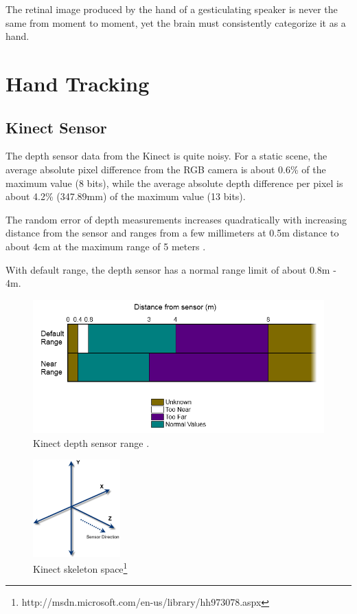\begin{savequote}
The retinal image produced by the hand of a gesticulating
speaker is never the same from moment to moment, yet the brain must consistently categorize
it as a hand. 
\end{savequote}
\chapter{Hand Tracking}

\section{Kinect Sensor}
The depth sensor data from the Kinect is quite noisy. For a static scene, the
average absolute pixel difference from the RGB camera is about 0.6\% of the maximum value (8
bits), while the average absolute depth difference per pixel is about 4.2\%
(347.89mm) of the maximum value (13 bits).

The random error of depth measurements increases quadratically with increasing distance from the 
sensor and ranges from a few millimeters at 0.5m distance to about 4cm
at the maximum range of 5 meters \cite{khoshelham2011}.

With default range, the depth sensor has a normal range limit of about 0.8m -
4m.

\begin{figure}[tbh]
\centering
\includegraphics[width=\textwidth]{figures/kinect_sensor_range.png}
\caption{Kinect depth sensor range \cite{microsoft-kinect}.}
\end{figure}

\begin{figure}[tbh]
\centering
\includegraphics[width=0.3\textwidth]{figures/skeleton_space.png}
\caption{Kinect skeleton
space\footnote{http://msdn.microsoft.com/en-us/library/hh973078.aspx}}
\label{}
\end{figure}

